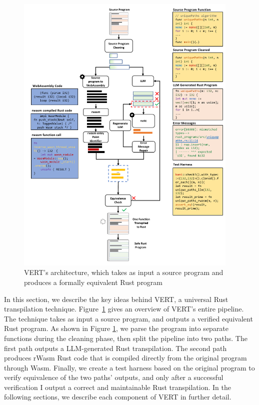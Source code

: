 \documentclass[12pt,openany,oneside,table]{cmuthesis}
\begin{document}
\begin{figure}
\centering
\includegraphics[width=0.95\textwidth]{figures/approach/gotorust_approach.pdf}
\vspace*{-3mm}
\caption{\small VERT’s architecture, which takes as input a source program and produces a formally equivalent Rust program}
\label{fig:overview}
\end{figure}

In this section, we describe the key ideas behind VERT, a universal Rust transpilation technique.
Figure~\ref{fig:overview} gives an overview of VERT's entire pipeline. The technique takes as input a source program, and outputs a verified equivalent Rust program. As shown in Figure \ref{fig:overview}, we parse the program into separate functions during the cleaning phase, then split the pipeline into two paths. The first path outputs a LLM-generated Rust transpilation. The second path produces rWasm Rust code that is compiled directly from the original program through Wasm. Finally, we create a test harness based on the original program to verify equivalence of the two paths' outputs, and only after a successful verification I output a correct and maintainable Rust transpilation. In the following sections, we describe each component of VERT in further detail.
\end{document}
